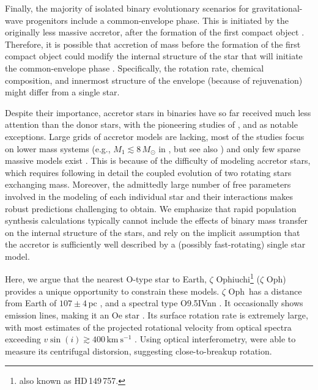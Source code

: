\documentclass[twocolumn,twocolappendix,trackchanges]{aastex63}
\newcommand{\kms}{{\mathrm{km\ s^{-1}}}}
\newcommand{\zoph}{$\zeta$ Oph}
\begin{document}
Finally, the majority of isolated binary evolutionary scenarios for
gravitational-wave progenitors include a common-envelope
phase. This is initiated by the originally less massive accretor,
after the formation of the first compact object
\citep[e.g.,][]{belczynski:16nat, tauris:17,
  broekgaarden:21}. Therefore, it is possible that accretion of mass
before the formation of the first compact object could modify the
internal structure of the star that will initiate the common-envelope
phase \citep[e.g.,][]{law-smith:20, klencki:21}. Specifically, the
rotation rate, chemical composition, and innermost structure of the
envelope (because of rejuvenation) might differ from a single star.

Despite their importance, accretor stars in binaries have so far
received much less attention than the donor stars, with the pioneering
studies of \cite{ulrich:76, hellings:83, hellings:84}, and
\cite{braun:95} as notable exceptions. Large grids of accretor models
are lacking, most of the studies focus on lower mass systems
(e.g., $M_1\lesssim 8\,M_\odot$ in \citealt{vanrensbergen:11}, but see also
\citealt{wang:20}) and only few sparse massive models exist
\citep[e.g.,][]{cantiello:07}. This is because of the difficulty of
modeling accretor stars, which requires following in detail the coupled
evolution of two rotating stars exchanging mass. Moreover, the
admittedly large number of free parameters involved in the modeling of
each individual star and their interactions makes robust predictions
challenging to obtain. We emphasize that rapid population synthesis
calculations typically cannot include the effects of binary mass
transfer on the internal structure of the stars, and rely on the
implicit assumption that the accretor is sufficiently well described
by a (possibly fast-rotating) single star model.

Here, we argue that the nearest O-type star to
Earth, $\zeta$ Ophiuchi\footnote{also known as HD\,149\,757.} (\zoph)
provides a unique opportunity to constrain these models.
\zoph\ has a distance from Earth of $107\pm4$\,pc \citep[][and
references therein]{neuhauser:20}, and a spectral type O9.5{\rm IVnn}
\citep{sota:14}. It occasionally shows emission lines, making it an Oe
star \citep{walker:79, vink:09}. Its surface rotation
rate is extremely large, with most estimates of the projected
rotational velocity from optical spectra exceeding
$v\sin(i)\gtrsim 400\,\kms$ \citep[corresponding to the ``nn'' in the
spectral type, e.g.,][]{zehe:18}. Using optical
interferometry, \cite{gordon:18} were able to measure its centrifugal
distorsion, suggesting close-to-breakup rotation.
\end{document}
